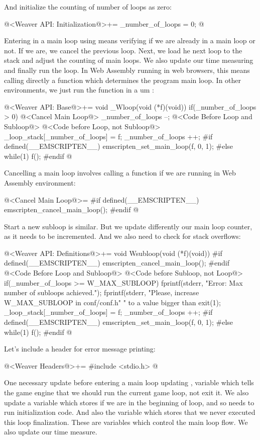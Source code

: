 And initialize the counting of number of loops as zero:

\iniciocodigo
@<Weaver API: Initialization@>+=
_number_of_loops = 0;
@
\fimcodigo

Entering in a main loop using  means verifying if we
are already in a main loop or not. If we are, we cancel the previous
loop. Next, we load he next loop to the stack and adjust the counting
of main loops. We also update our time measuring and finally run the
loop. In Web Assembly running in web browsers, this means calling
directly a function which determines the program main loop. In other
environments, we just run the function in a um :

\iniciocodigo
@<Weaver API: Base@>+=
void _Wloop(void (*f)(void)){
  if(_number_of_loops > 0){
    @<Cancel Main Loop@>
    _number_of_loops --;
  }
  @<Code Before Loop and Subloop@>
  @<Code before Loop, not Subloop@>
  _loop_stack[_number_of_loops] = f;
  _number_of_loops ++;
#if defined(__EMSCRIPTEN__)
  emscripten_set_main_loop(f, 0, 1);
#else
  while(1)
    f();
#endif
}
@
\fimcodigo

Cancelling a main loop involves calling a function if we are running
in Web Assembly environment:

\iniciocodigo
@<Cancel Main Loop@>=
#if defined(__EMSCRIPTEN__)
emscripten_cancel_main_loop();
#endif
@
\fimcodigo

Start a new subloop is similar. But we update differently our main
loop counter, as it needs to be incremented. And we also need to check
for stack overflows:

\iniciocodigo
@<Weaver API: Definitions@>+=
void Wsubloop(void (*f)(void)){
#if defined(__EMSCRIPTEN__)
    emscripten_cancel_main_loop();
#endif
  @<Code Before Loop and Subloop@>
  @<Code before Subloop, not Loop@>
  if(_number_of_loops >= W_MAX_SUBLOOP){
    fprintf(stderr, "Error: Max number of subloops achieved.\n");
    fprintf(stderr, "Please, increase W_MAX_SUBLOOP in conf/conf.h"
            " to a value bigger than %
    exit(1);
  }
  _loop_stack[_number_of_loops] = f;
  _number_of_loops ++;
#if defined(__EMSCRIPTEN__)
  emscripten_set_main_loop(f, 0, 1);
#else
  while(1)
    f();
#endif
}
@
\fimcodigo

Let's include a header for error message printing:

@<Weaver Headers@>+=
#include <stdio.h>
@

One necessary update before entering a main loop updating
, variable which tells the game engine
that we should run the current game loop, not exit it. We also update
a variable which stores if we are in the beginning of loop, and so
needs to run initialization code. And also the variable which stores
that we never executed this loop finalization. These are variables
which control the main loop flow. We also update our time measure.

